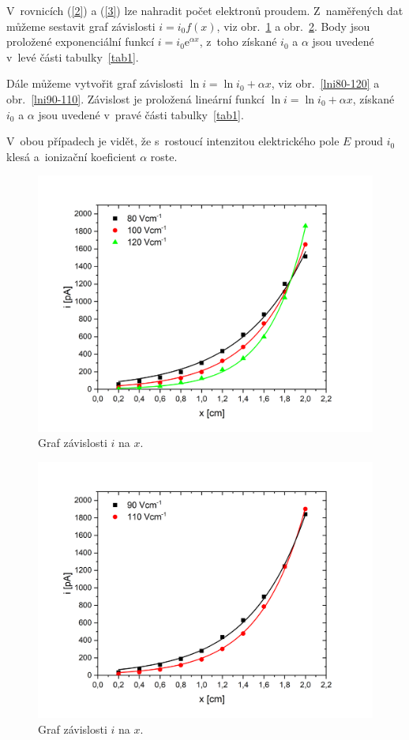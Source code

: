 \documentclass[a4paper,12pt]{article}
\newcommand{\e}{\text{e}}
\begin{document}
V~rovnicích (\ref{2}) a (\ref{3}) lze nahradit počet elektronů proudem. 
Z~naměřených dat můžeme sestavit graf závislosti $i = i_0 f(x)$, viz 
obr.~\ref{ifx80-120} a obr.~\ref{ifx90-110}. Body jsou proložené exponenciální funkcí $i = i_0 \e^{\alpha 
x}$, z~toho získané $i_0$ a $\alpha$ jsou uvedené v~levé části 
tabulky~\ref{tab1}.

Dále můžeme vytvořit graf závislosti $\ln i = \ln i_0 + \alpha x$, viz 
obr.~\ref{lni80-120} a obr.~\ref{lni90-110}. Závislost je proložená lineární funkcí $\ln i =\ln i_0 + \alpha x$, 
získané $i_0$ a $\alpha$ jsou uvedené v~pravé části tabulky~\ref{tab1}.

V~obou případech je vidět, že s~rostoucí intenzitou elektrického pole $E$ proud $i_0$ klesá a~ionizační koeficient $\alpha$ roste.

\begin{figure}[h!]
	\centering
	\includegraphics[width=145mm]{ifx80-120.png}
	\caption{Graf závislosti $i$ na $x$.}
	\label{ifx80-120}
\end{figure}

\begin{figure}[h!]
	\centering
	\includegraphics[width=145mm]{ifx90-110.png}
	\caption{Graf závislosti $i$ na $x$.}
	\label{ifx90-110}
\end{figure}
\end{document}
